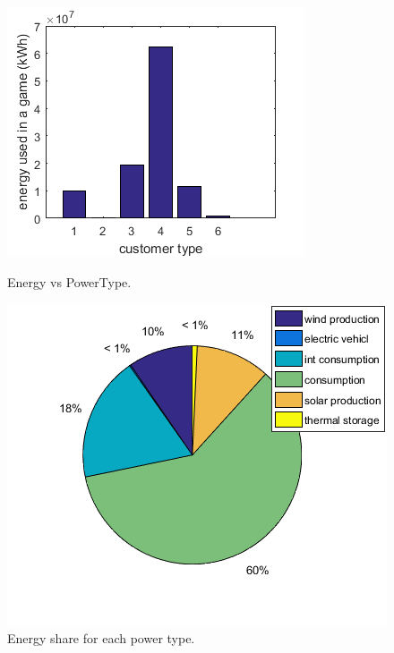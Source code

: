 \begin{itemize}
\begin{figure}
\centering
\begin{minipage}{.5\textwidth}
  \includegraphics[width=\linewidth]{3-energy-vs-powertype.png}
  \caption{Energy vs PowerType.}
  \label{fig:energy-pt}
\end{minipage}%
\begin{minipage}{.5\textwidth}
  \includegraphics[width=\linewidth]{pie-energy-share.png}
  \caption{Energy share for each power type.}
  \label{fig:energy-shares}
\end{minipage}

\end{figure}

\end{itemize}
